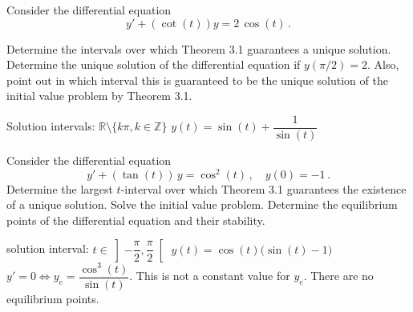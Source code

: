 

\begin{Exercise}  Consider the differential equation
$$y'+\left(\cot(t)\right)y=2\,\cos (t)\,.$$

\Question Determine the intervals over which Theorem 3.1 guarantees a unique solution.
\Question Determine the unique solution of the differential equation if $y(\pi/2)=2$. Also, point out in which interval this is guaranteed to be the unique solution of the initial value problem by Theorem 3.1.
\end{Exercise}

\begin{Answer}\phantom{}
        \Question Solution intervals: $\mathbb{R}\setminus\{k\pi,k\in \mathbb{Z}\}$
        \Question $y(t) = \sin (t) + \dfrac{1}{\sin (t)}$ %
\end{Answer}

\begin{Exercise} Consider the differential equation 
$$
y'+\left(\tan (t)\right)\,y=\cos^2 (t)\,,\quad y(0)=-1\,.
$$
\Question Determine the largest $t$-interval over which Theorem 3.1 guarantees the existence of a unique solution.
\Question Solve the initial value problem.
\Question Determine the equilibrium points of the differential equation and their stability.
\end{Exercise}


\begin{Answer}\phantom{}
         \Question solution interval: $t \in \left]-\dfrac{\pi}{2},\dfrac{\pi}{2}\right[$
        \Question $y(t) = \cos(t)\big(\sin(t) - 1 \big)$
        \Question $y' = 0 \Leftrightarrow y_e = \dfrac{\cos^3(t)}{\sin(t)}$. This is not a constant value for $y_e$. There are no equilibrium points. %
\end{Answer}

